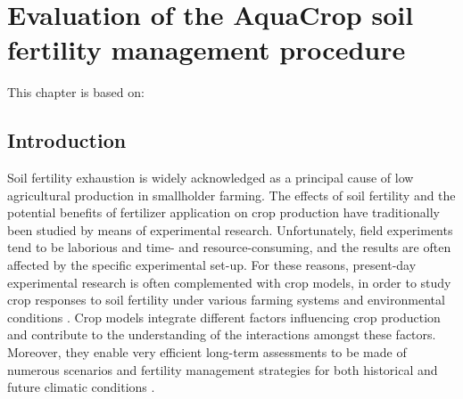 \chapter{Evaluation of the AquaCrop soil fertility management procedure}\label{ch:fertility}

This chapter is based on:\\

\section{Introduction}
Soil fertility exhaustion is widely acknowledged as a principal cause of low agricultural production in smallholder farming. The effects of soil fertility and the potential benefits of fertilizer application on crop production have traditionally been studied by means of experimental research. Unfortunately, field experiments tend to be laborious and time- and resource-consuming, and the results are often affected by the specific experimental set-up. For these reasons, present-day experimental research is often complemented with crop models, in order to study crop responses to soil fertility under various farming systems and environmental conditions \parencite{myers2005}. Crop models integrate different factors influencing crop production and contribute to the understanding of the interactions amongst these factors. Moreover, they enable very efficient long-term assessments to be made of numerous scenarios and fertility management strategies \parencite{boote1996,carberry2002a} for both historical and future climatic conditions \parencite{tubiello2002}.

